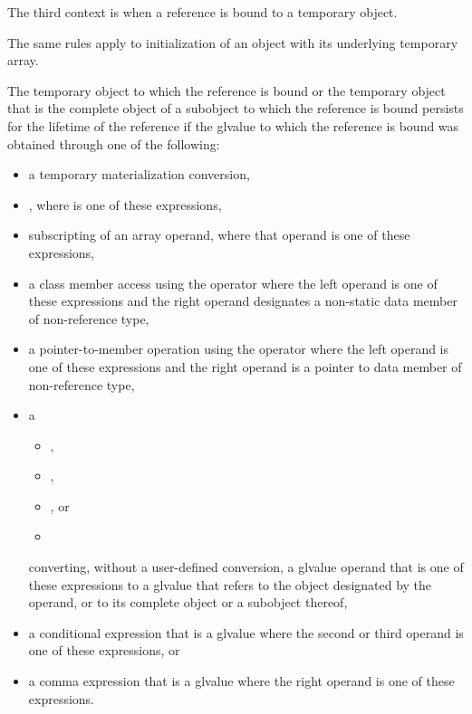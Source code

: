 \pnum
The third context is when a reference is bound to a
temporary object.
\begin{footnote}
The same rules apply to initialization of an
   object with its
  underlying temporary array.
\end{footnote}
The temporary object to which the reference is bound or the temporary object
that is the complete object of a subobject to which the reference is bound
persists for the lifetime of the reference if the glvalue
to which the reference is bound
was obtained through one of the following:
\begin{itemize}
\item
  a temporary materialization conversion,
\item
  \tcode{(}  \tcode{)},
  where  is one of these expressions,
\item
  subscripting of an array operand,
  where that operand is one of these expressions,
\item
  a class member access using the  operator
  where the left operand is one of these expressions and
  the right operand designates a non-static data member of non-reference type,
\item
  a pointer-to-member operation using the  operator
  where the left operand is one of these expressions and
  the right operand is a pointer to data member of non-reference type,
\item
  a
  \begin{itemize}
  \item {},
  \item {},
  \item {}, or
  \item {}
  \end{itemize}
  converting, without a user-defined conversion,
  a glvalue operand that is one of these expressions
  to a glvalue that refers
  to the object designated by the operand, or
  to its complete object or a subobject thereof,
\item
  a conditional expression that is a glvalue
  where the second or third operand is one of these expressions, or
\item
  a comma expression that is a glvalue
  where the right operand is one of these expressions.
\end{itemize}
